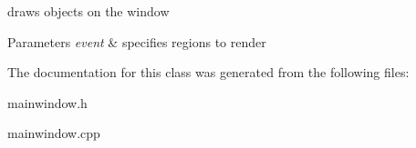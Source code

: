 draws objects on the window 


\begin{DoxyParams}{Parameters}
{\em event} & specifies regions to render \\
\hline
\end{DoxyParams}


The documentation for this class was generated from the following files\+:\begin{DoxyCompactItemize}
\item 
mainwindow.\+h\item 
mainwindow.\+cpp\end{DoxyCompactItemize}
